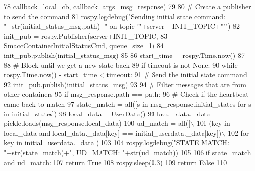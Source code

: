 \begin{DoxyCode}
78                 callback=local\_cb, callback\_args=msg\_response)
79 
80         \textcolor{comment}{# Create a publisher to send the command}
81         rospy.logdebug(\textcolor{stringliteral}{"Sending initial state command: "}+str(initial\_status\_msg.path)+\textcolor{stringliteral}{" on topic '"}+server+
      INIT\_TOPIC+\textcolor{stringliteral}{"'"})
82         init\_pub = rospy.Publisher(server+INIT\_TOPIC,
83                 SmaccContainerInitialStatusCmd, queue\_size=1)
84         init\_pub.publish(initial\_status\_msg)
85 
86         start\_time = rospy.Time.now()
87 
88         \textcolor{comment}{# Block until we get a new state back }
89         \textcolor{keywordflow}{if} timeout \textcolor{keywordflow}{is} \textcolor{keywordflow}{not} \textcolor{keywordtype}{None}:
90             \textcolor{keywordflow}{while} rospy.Time.now() - start\_time < timeout:
91                 \textcolor{comment}{# Send the initial state command}
92                 init\_pub.publish(initial\_status\_msg)
93 
94                 \textcolor{comment}{# Filter messages that are from other containers}
95                 \textcolor{keywordflow}{if} msg\_response.path == path:
96                     \textcolor{comment}{# Check if the heartbeat came back to match}
97                     state\_match = all([s \textcolor{keywordflow}{in} msg\_response.initial\_states \textcolor{keywordflow}{for} s \textcolor{keywordflow}{in} initial\_states])
98                     local\_data = \hyperlink{classsmacc__viewer_1_1smacc__user__data_1_1UserData}{UserData}()
99                     local\_data.\_data = pickle.loads(msg\_response.local\_data)
100                     ud\_match = all([\(\backslash\)
101                             (key \textcolor{keywordflow}{in} local\_data \textcolor{keywordflow}{and} local\_data.\_data[key] == initial\_userdata.\_data[key])\(\backslash\)
102                             \textcolor{keywordflow}{for} key \textcolor{keywordflow}{in} initial\_userdata.\_data])
103 
104                     rospy.logdebug(\textcolor{stringliteral}{"STATE MATCH: "}+str(state\_match)+\textcolor{stringliteral}{", UD\_MATCH: "}+str(ud\_match))
105 
106                     \textcolor{keywordflow}{if} state\_match \textcolor{keywordflow}{and} ud\_match:
107                         \textcolor{keywordflow}{return} \textcolor{keyword}{True}
108                 rospy.sleep(0.3)
109             \textcolor{keywordflow}{return} \textcolor{keyword}{False}
110 
\end{DoxyCode}


